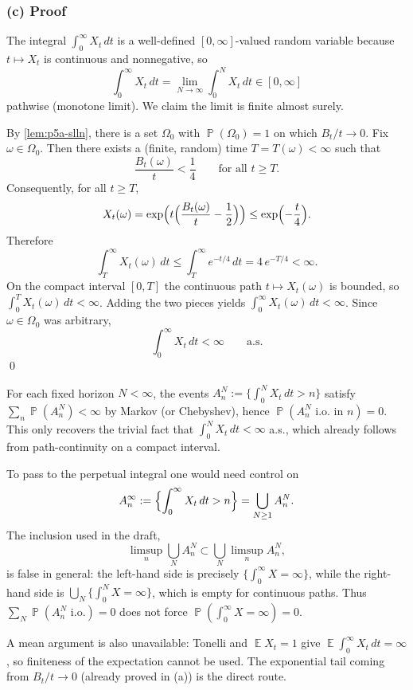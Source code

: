 \documentclass[11pt,a4paper]{article}
\DeclareMathOperator{\E}{\mathbb{E}}
\DeclareMathOperator{\Pbb}{\mathbb{P}}
\begin{document}
\subsubsection{(c) Proof}

The integral \(\int_0^\infty X_t\,dt\) is a well-defined \([0,\infty]\)-valued random variable because \(t\mapsto X_t\) is continuous and nonnegative, so
\[
\int_0^\infty X_t\,dt
=
\lim_{N\to\infty}\int_0^N X_t\,dt
\in[0,\infty]
\]
pathwise (monotone limit). We claim the limit is finite almost surely.

By \cref{lem:p5a-slln}, there is a set \(\Omega_0\) with \(\Pbb(\Omega_0)=1\) on which \(B_t/t\to 0\). Fix \(\omega\in\Omega_0\). Then there exists a (finite, random) time \(T=T(\omega)<\infty\) such that
\[
\frac{B_t(\omega)}{t}
<
\frac14
\qquad\text{for all }t\ge T.
\]
Consequently, for all \(t\ge T\),
\[
X_t(\omega)
=
\exp\Bigl(t\Bigl(\frac{B_t(\omega)}{t}-\frac12\Bigr)\Bigr)
\le
\exp\Bigl(-\frac{t}{4}\Bigr).
\]
Therefore
\[
\int_T^\infty X_t(\omega)\,dt
\le
\int_T^\infty e^{-t/4}\,dt
=
4\,e^{-T/4}
<
\infty.
\]
On the compact interval \([0,T]\) the continuous path \(t\mapsto X_t(\omega)\) is bounded, so \(\int_0^T X_t(\omega)\,dt<\infty\). Adding the two pieces yields \(\int_0^\infty X_t(\omega)\,dt<\infty\). Since \(\omega\in\Omega_0\) was arbitrary,
\[
\int_0^\infty X_t\,dt
<
\infty
\qquad\text{a.s.}
\]
\qed

\begin{remark*}
For each fixed horizon \(N<\infty\), the events \(A_n^N:=\{\int_0^N X_t\,dt>n\}\) satisfy \(\sum_n\Pbb(A_n^N)<\infty\) by Markov (or Chebyshev), hence \(\Pbb(A_n^N\text{ i.o.\ in }n)=0\). This only recovers the trivial fact that \(\int_0^N X_t\,dt<\infty\) a.s., which already follows from path-continuity on a compact interval.

To pass to the perpetual integral one would need control on
\[
A_n^\infty
:=
\Bigl\{\int_0^\infty X_t\,dt>n\Bigr\}
=
\bigcup_{N\ge 1}A_n^N.
\]
The inclusion used in the draft,
\[
\limsup_n\bigcup_N A_n^N
\subset
\bigcup_N\limsup_n A_n^N,
\]
is false in general: the left-hand side is precisely \(\{\int_0^\infty X=\infty\}\), while the right-hand side is \(\bigcup_N\{\int_0^N X=\infty\}\), which is empty for continuous paths. Thus \(\sum_N\Pbb(A_n^N\text{ i.o.})=0\) does not force \(\Pbb(\int_0^\infty X=\infty)=0\).

A mean argument is also unavailable: Tonelli and \(\E X_t=1\) give \(\E\int_0^\infty X_t\,dt=\infty\), so finiteness of the expectation cannot be used. The exponential tail coming from \(B_t/t\to 0\) (already proved in (a)) is the direct route.
\end{remark*}
\end{document}
